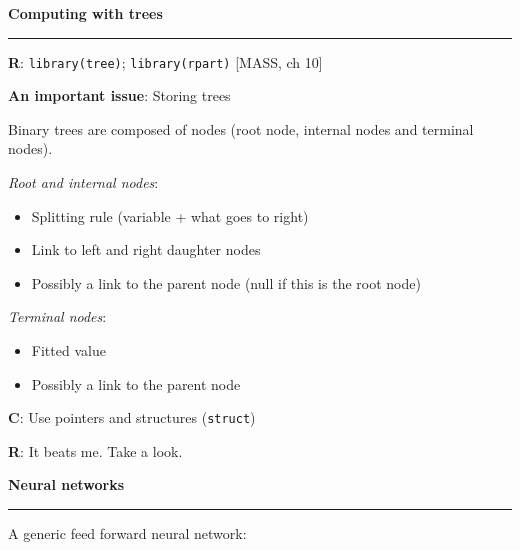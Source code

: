 \documentclass[12pt,letterpaper]{article}
\newcommand{\HRule}{\rule{\linewidth}{4pt}}
\newcommand{\vsphalf}{\vspace*{0.5cm}}
\newcommand{\vspone}{\vspace*{1cm}}
\begin{document}
\newpage

\fontsize{30}{30} \selectfont

\centerline{\textbf{Computing with trees}}

\HRule

\vsphalf

\fontsize{20}{25} \selectfont

\textbf{R}: \verb|library(tree)|; \verb|library(rpart)|  
[MASS, ch 10]

\vspone

\textbf{An important issue}: Storing trees

\vsphalf

Binary trees are composed of nodes (root node, internal nodes and
terminal nodes).

\vsphalf

\emph{Root and internal nodes}:
\begin{itemize}
\item Splitting rule (variable + what goes to right)
\item Link to left and right daughter nodes
\item Possibly a link to the parent node (null if this is the root
  node)
\end{itemize}

\emph{Terminal nodes}:
\begin{itemize}
\item Fitted value
\item Possibly a link to the parent node
\end{itemize}

\vspone

\textbf{C}: Use pointers and structures (\verb|struct|)

\vsphalf

\textbf{R}: It beats me.  Take a look.


  

\newpage

\fontsize{30}{30} \selectfont

\centerline{\textbf{Neural networks}}

\HRule

\vsphalf

\fontsize{20}{25} \selectfont


A generic feed forward neural network:
\end{document}
